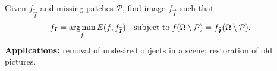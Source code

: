 Given $f_{\widetilde{\vec{I}}}$ and missing patches $\mathcal{P}$, find image $f_{\vec{I}}$ such that
\begin{align*}
	f_{\bm{I}} &= \operatorname*{arg\,min}_f E(f,f_{\widetilde{\bm{I}}}) \quad \text{subject to}\; f(\Omega \setminus \mathcal{P}) = f_{\widetilde{\bm{I}}}(\Omega \setminus \mathcal{P}).
\end{align*}
%
\textbf{Applications:} removal of undesired objects in a scene; restoration of old pictures. 

\begin{figure}
\center
{}\hspace{2em}%
\\%
\end{figure}
